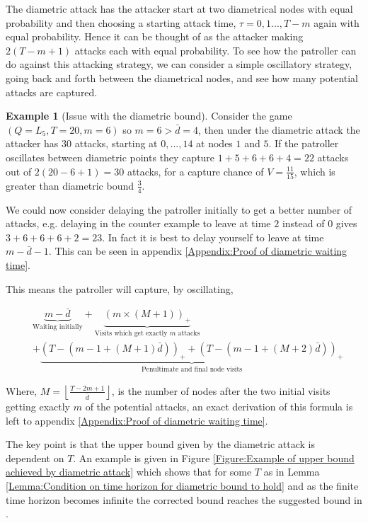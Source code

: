 \documentclass[a4paper,10pt]{article}
\newcommand{\floor}[1]{\left \lfloor #1 \right \rfloor}
\newcommand{\pospart}[1]{\left( #1 \right)_{+}}
\theoremstyle{definition}
\theoremstyle{definition}
\newtheorem{example}[theorem]{Example}
\theoremstyle{remark}
\theoremstyle{definition}
\begin{document}
The diametric attack has the attacker start at two diametrical nodes with equal probability and then choosing a starting attack time, $\tau=0,1...,T-m$ again with equal probability. Hence it can be thought of as the attacker making $2(T-m+1)$ attacks each with equal probability. To see how the patroller can do against this attacking strategy, we can consider a simple oscillatory strategy, going back and forth between the diametrical nodes, and see how many potential attacks are captured.

\begin{example}[Issue with the diametric bound]
Consider the game $(Q=L_{5},T=20,m=6)$ so $m=6 >\bar{d}=4$, then under the diametric attack the attacker has $30$ attacks, starting at $0,...,14$ at nodes $1$ and $5$. If the patroller oscillates between diametric points they capture
$1+5+6+6+4=22$ attacks out of $2(20-6+1)=30$ attacks, for a capture chance of $V=\frac{11}{15}$, which is greater than diametric bound $\frac{3}{4}$.
\end{example}

We could now consider delaying the patroller initially to get a better number of attacks, e.g. delaying in the counter example to leave at time $2$ instead of $0$ gives $3+6+6+6+2=23$. In fact it is best to delay yourself to leave at time $m-\bar{d}-1$. This can be seen in appendix \ref{Appendix:Proof of diametric waiting time}.

This means the patroller will capture, by oscillating,

\begin{align*}
&\underbrace{m-\bar{d}}_{\text{Waiting initially}} + \underbrace{\pospart{m \times \left( M +1 \right)}}_{\text{Visits which get exactly } m \text{ attacks}} \\
&+ \underbrace{\pospart{T- \left( m-1 + \left(M +1 \right) \bar{d} \right)}+\pospart{T- \left( m-1 + \left(M +2 \right) \bar{d} \right)}}_{\text{Penultimate and final node visits}} 
\end{align*}

Where, $M=\floor{\frac{T-2m+1}{\bar{d}}}$, is the number of nodes after the two initial visits getting exactly $m$ of the potential attacks, an exact derivation of this formula is left to appendix \ref{Appendix:Proof of diametric waiting time}.

The key point is that the upper bound given by the diametric attack is dependent on $T$. An example is given in Figure \ref{Figure:Example of upper bound achieved by diametric attack} which shows that for some $T$ as in Lemma \ref{Lemma:Condition on time horizon for diametric bound to hold} and as the finite time horizon becomes infinite the corrected bound reaches the suggested bound in \cite{Alpern2011}.
\end{document}
